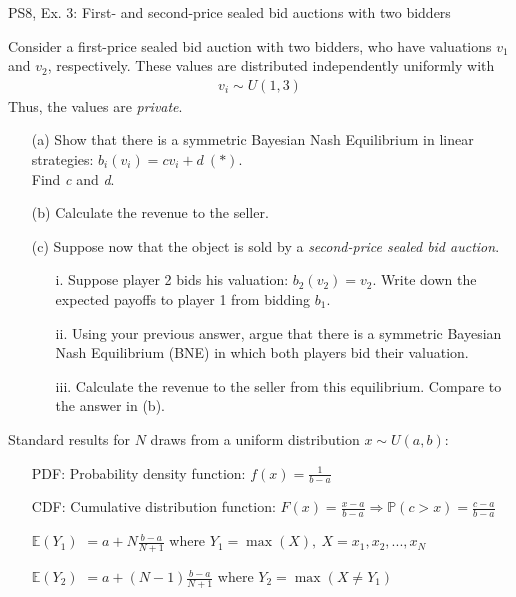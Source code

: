 \begin{frame}{PS8, Ex. 3: First- and second-price sealed bid auctions with two bidders}
    \begin{multicols}{2}
      Consider a first-price sealed bid auction with two bidders, who have valuations $v_1$ and $v_2$, respectively. These values are distributed independently uniformly with
      \begin{align*}
        v_i\sim U(1,3)
      \end{align*}
      Thus, the values are \textit{private}.
      \begin{itemize}
        \item[(a)] Show that there is a symmetric Bayesian Nash Equilibrium in linear strategies: $b_i(v_i) = cv_i + d\ (*)$.\\
                   Find \textit{c} and \textit{d}.
        \item[(b)] Calculate the revenue to the seller.
      \end{itemize}
      \vfill\null\columnbreak
      \begin{itemize}
        \item[(c)] Suppose now that the object is sold by a \textit{second-price sealed bid auction}.
        \begin{itemize}\normalsize
          \item[i.]   Suppose player 2 bids his valuation: $b_2(v_2) = v_2$. Write down the expected payoffs to player 1 from bidding $b_1$.
          \item[ii.]  Using your previous answer, argue that there is a symmetric Bayesian Nash Equilibrium (BNE) in which both players bid their valuation.
          \item[iii.] Calculate the revenue to the seller from this equilibrium. Compare to the answer in (b).
        \end{itemize}
      \end{itemize}
      \vfill\null
    \end{multicols}
    \vspace{-16pt}
    Standard results for $N$ draws from a uniform distribution $x\sim U(a, b):$
    \begin{enumerate}
      \item[PDF:] Probability density function: $f(x)=\frac{1}{b-a}$
      \item[CDF:] Cumulative distribution function: $F(x)=\frac{x-a}{b-a}\Rightarrow\mathbb{P}(c>x)=\frac{c-a}{b-a}$
      \item[$\mathbb{E}(Y_1)$] $=a+N\frac{b-a}{N+1}$ where $Y_1=\max(X),\ X=x_1,x_2,...,x_N$
      \item[$\mathbb{E}(Y_2)$] $=a+(N-1)\frac{b-a}{N+1}$ where $Y_2=\max(X\neq Y_1)$
    \end{enumerate}
    \vfill\null
\end{frame}



